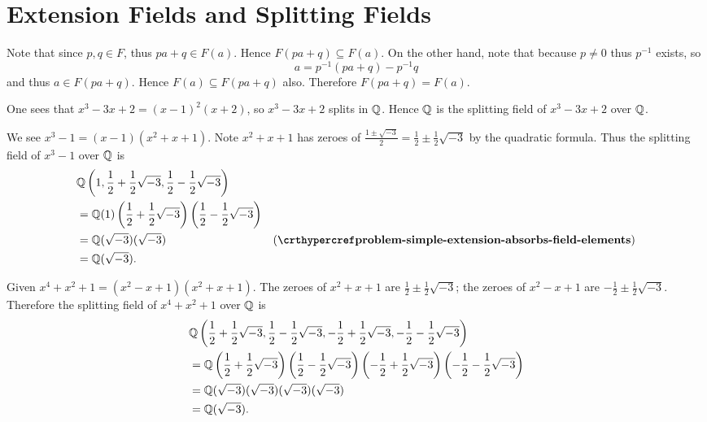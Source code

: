 \section{Extension Fields and Splitting Fields}
\begin{questions}
    \item Note that since $p, q \in F$, thus $pa + q \in F(a)$. Hence $F(pa+q) \subseteq F(a)$. On the other hand, note that because $p \neq 0$ thus $p^{-1}$ exists, so
    \[
        a = p^{-1}(pa+q) - p^{-1}q
    \]
    and thus $a \in F(pa+q)$. Hence $F(a) \subseteq F(pa+q)$ also. Therefore $F(pa+q) = F(a)$.

    \item \begin{partquestions}{\alph*}
        \item One sees that $x^3-3x+2 = (x-1)^2(x+2)$, so $x^3-3x+2$ splits in $\mathbb{Q}$. Hence $\mathbb{Q}$ is the splitting field of $x^3-3x+2$ over $\mathbb{Q}$.

        \item We see $x^3 - 1 = (x-1)(x^2+x+1)$. Note $x^2 + x + 1$ has zeroes of $\frac{1\pm\sqrt{-3}}{2} = \frac12 \pm \frac12\sqrt{-3}$ by the quadratic formula. Thus the splitting field of $x^3 - 1$ over $\mathbb{Q}$ is
        \begin{align*}
            &\Q\left(1, \frac12 + \frac12\sqrt{-3}, \frac12 - \frac12\sqrt{-3}\right)\\
            &=\Q(1)\left(\frac12 + \frac12\sqrt{-3}\right)\left(\frac12 - \frac12\sqrt{-3}\right)\\
            &=\Q(\sqrt{-3})(\sqrt{-3}) & (\myref{problem-simple-extension-absorbs-field-elements})\\
            &=\Q(\sqrt{-3}).
        \end{align*}

        \item Given $x^4 + x^2 + 1 = (x^2 - x + 1)(x^2 + x + 1)$. The zeroes of $x^2 + x + 1$ are $\frac12 \pm \frac12\sqrt{-3}$; the zeroes of $x^2 - x + 1$ are $-\frac12 \pm \frac12\sqrt{-3}$. Therefore the splitting field of $x^4 + x^2 + 1$ over $\mathbb{Q}$ is
        \begin{align*}
            &\mathbb{Q}\left(\frac12 + \frac12\sqrt{-3}, \frac12 - \frac12\sqrt{-3}, -\frac12 + \frac12\sqrt{-3}, -\frac12 - \frac12\sqrt{-3}\right)\\
            &=\mathbb{Q}\left(\frac12 + \frac12\sqrt{-3}\right)\left(\frac12 - \frac12\sqrt{-3}\right)\left(-\frac12 + \frac12\sqrt{-3}\right)\left(-\frac12 - \frac12\sqrt{-3}\right)\\
            &=\mathbb{Q}(\sqrt{-3})(\sqrt{-3})(\sqrt{-3})(\sqrt{-3})\\
            &= \mathbb{Q}(\sqrt{-3}).
        \end{align*}


\end{partquestions}
\end{questions}
